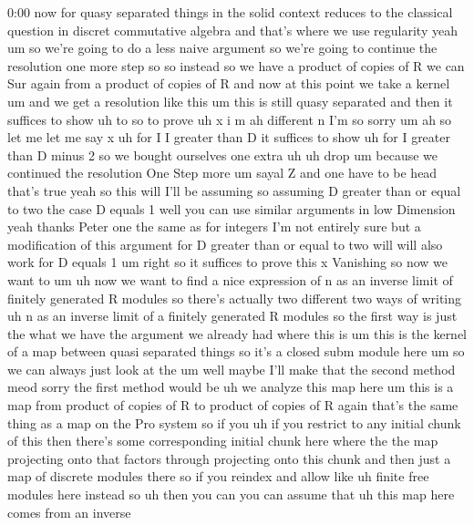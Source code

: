 \begin{unfinished}{0:00}
now  for  quasy  separated  things  in  the
solid  context
reduces  to  the  classical  question  in
discret  commutative  algebra  and  that's
where  we  use  regularity
yeah  um  so  we're  going  to  do  a  less
naive  argument  so  we're  going  to
continue  the  resolution  one  more  step
so  so
instead  so  we  have  a  product  of  copies
of  R  we  can  Sur  again  from  a  product  of
copies  of  R  and  now  at  this  point  we
take  a
kernel
um  and  we  get  a  resolution  like
this  um  this  is  still  quasy  separated
and  then  it  suffices  to
show  uh  to  so  to
prove  uh  x  i  m  ah  different  n  I'm  so
sorry
um  ah  so  let  me  let  me  say  x
uh  for  I  I  greater  than  D  it  suffices  to
show
uh  for  I  greater  than  D  minus  2  so  we
bought  ourselves  one  extra
uh
uh  drop  um  because  we  continued  the
resolution  One  Step
more  um  sayal  Z  and  one  have  to  be  head
that's  true  yeah  so  this  will  I'll  be
assuming  so  assuming  D  greater  than  or
equal  to  two  the  case  D  equals  1  well
you  can  use  similar  arguments  in  low
Dimension  yeah  thanks
Peter  one  the  same  as  for  integers  I'm
not  entirely  sure  but  a  modification  of
this  argument  for  D  greater  than  or
equal  to  two  will  will  also  work  for  D
equals
1  um  right  so  it  suffices  to  prove  this
x  Vanishing  so  now  we  want  to
um  uh  now  we  want  to  find  a  nice
expression  of  n  as  an  inverse  limit  of
finitely  generated  R  modules  so  there's
actually  two  different  two
ways  of
writing
uh  n  as  an  inverse
limit  of  a  finitely  generated  R
modules  so  the  first  way  is  just  the
what  we  have  the  argument  we  already  had
where  this  is  um  this  is  the  kernel  of  a
map  between  quasi  separated  things  so
it's  a  closed  subm  module  here  um  so  we
can  always  just  look  at
the  um  well  maybe  I'll  make  that  the
second  method  meod  sorry  the  first
method  would  be  uh  we  analyze  this  map
here  um  this  is  a  map  from  product  of
copies  of  R  to  product  of  copies  of  R
again  that's  the  same  thing  as  a  map  on
the  Pro  system  so  if  you  uh  if  you
restrict  to  any  initial  chunk  of  this
then  there's  some  corresponding  initial
chunk  here  where  the  the  map  projecting
onto  that  factors  through  projecting
onto  this  chunk  and  then  just  a  map  of
discrete  modules  there  so  if  you  reindex
and  allow
like  uh  finite  free  modules  here  instead
so  uh  then  you  can  you  can  assume  that
uh  this  map  here  comes  from  an  inverse

\end{unfinished}
